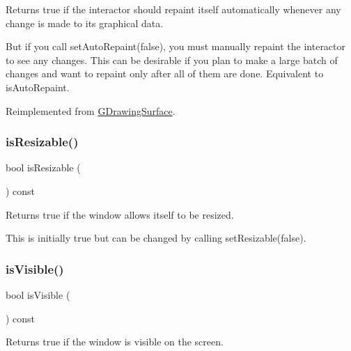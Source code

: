 Returns true if the interactor should repaint itself automatically whenever any change is made to its graphical data. 

But if you call set\+Auto\+Repaint(false), you must manually repaint the interactor to see any changes. This can be desirable if you plan to make a large batch of changes and want to repaint only after all of them are done. Equivalent to is\+Auto\+Repaint. 

Reimplemented from \mbox{\hyperlink{classsgl_1_1GDrawingSurface_a82a00267c81cc0ae85ee0feb01a92fa8}{G\+Drawing\+Surface}}.

\mbox{\label{classsgl_1_1GWindow_a2afeea3d26d063fa35c104e73275cec7}} 
\subsubsection{\texorpdfstring{is\+Resizable()}{isResizable()}}
{\footnotesize\ttfamily bool is\+Resizable (\begin{DoxyParamCaption}{ }\end{DoxyParamCaption}) const\hspace{0.3cm}{\ttfamily [virtual]}}



Returns true if the window allows itself to be resized. 

This is initially true but can be changed by calling set\+Resizable(false). \mbox{\label{classsgl_1_1GWindow_a9d8a6cfb13917785c143e74d40e4e2be}} 
\subsubsection{\texorpdfstring{is\+Visible()}{isVisible()}}
{\footnotesize\ttfamily bool is\+Visible (\begin{DoxyParamCaption}{ }\end{DoxyParamCaption}) const\hspace{0.3cm}{\ttfamily [virtual]}}



Returns true if the window is visible on the screen. 

\mbox{\label{classsgl_1_1GWindow_ae2462f15e288c06c5136e31a8ac8151c}} 
